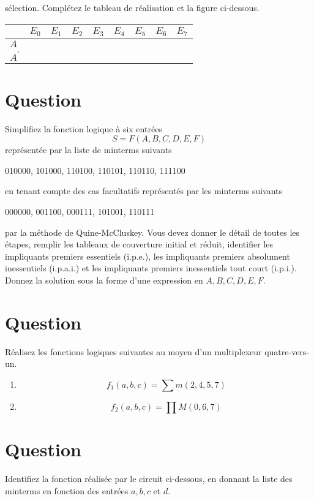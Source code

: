\documentclass[letter, oneside]{book}
\begin{document}
sélection. Complétez le tableau de réalisation et la figure
ci-dessous.
\begin{center}
\begin{tabular}{lllllllll}
 & \(E_0\) & \(E_1\) & \(E_2\) & \(E_3\) & \(E_4\) & \(E_5\) & \(E_6\) & \(E_7\)\\[0pt]
\hline
\(A\) &  &  &  &  &  &  &  & \\[0pt]
\(A^\prime\) &  &  &  &  &  &  &  & \\[0pt]
\end{tabular}
\end{center}
\begin{center}

\end{center}

\section*{Question}
\label{sec:orge4317e6}
Simplifiez la fonction logique à six entrées
  $$
    S = F(A,B,C,D,E,F)
    $$
  représentée par la liste de minterms suivants

010000, 101000, 110100, 110101, 110110, 111100

en tenant compte des cas facultatifs représentés par les minterms
suivants

000000, 001100, 000111, 101001, 110111

par la méthode de Quine-McCluskey. Vous devez donner le détail de
toutes les étapes, remplir les tableaux de couverture initial et
réduit, identifier les impliquants premiers essentiels (i.p.e.), les
impliquants premiers absolument inessentiels (i.p.a.i.) et les
impliquants premiers inessentiels tout court (i.p.i.). Donnez la
solution sous la forme d'une expression en \(A,B,C,D,E,F\).

\section*{Question}
\label{sec:orgf6ac9a4}
Réalisez les fonctions logiques suivantes au moyen d'un multiplexeur
  quatre-vers-un.

\begin{enumerate}
\item $$f_1(a,b,c) = \sum m(2, 4, 5, 7)$$

\item $$f_2(a,b,c) = \prod M(0, 6, 7)$$
\end{enumerate}

\section*{Question}
\label{sec:org7518213}
Identifiez la fonction réalisée par le circuit ci-dessous, en donnant
  la liste des minterms en fonction des entrées \(a, b, c\) et \(d\).
\begin{center}

\end{center}
\end{document}
